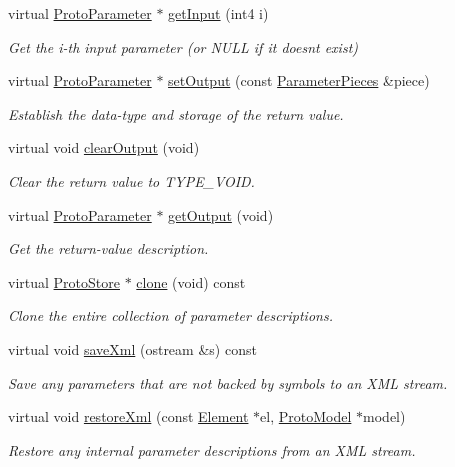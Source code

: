 \begin{DoxyCompactItemize}
virtual \mbox{\hyperlink{class_proto_parameter}{Proto\+Parameter}} $\ast$ \mbox{\hyperlink{class_proto_store_symbol_a55788c21f1b3699731f1956d75ef1d45}{get\+Input}} (int4 i)
\begin{DoxyCompactList}\small\item\em Get the i-\/th input parameter (or N\+U\+LL if it doesn\textquotesingle{}t exist) \end{DoxyCompactList}\item 
virtual \mbox{\hyperlink{class_proto_parameter}{Proto\+Parameter}} $\ast$ \mbox{\hyperlink{class_proto_store_symbol_a06c54299b4b14b6b41a26cdcee6d5484}{set\+Output}} (const \mbox{\hyperlink{struct_parameter_pieces}{Parameter\+Pieces}} \&piece)
\begin{DoxyCompactList}\small\item\em Establish the data-\/type and storage of the return value. \end{DoxyCompactList}\item 
virtual void \mbox{\hyperlink{class_proto_store_symbol_aadbd3a9fba172e28405eeb0001292bff}{clear\+Output}} (void)
\begin{DoxyCompactList}\small\item\em Clear the return value to T\+Y\+P\+E\+\_\+\+V\+O\+ID. \end{DoxyCompactList}\item 
virtual \mbox{\hyperlink{class_proto_parameter}{Proto\+Parameter}} $\ast$ \mbox{\hyperlink{class_proto_store_symbol_a19fe1743657cce5d27aec73bf9056566}{get\+Output}} (void)
\begin{DoxyCompactList}\small\item\em Get the return-\/value description. \end{DoxyCompactList}\item 
virtual \mbox{\hyperlink{class_proto_store}{Proto\+Store}} $\ast$ \mbox{\hyperlink{class_proto_store_symbol_aa6631290325889edb7ef7699fdd8a90f}{clone}} (void) const
\begin{DoxyCompactList}\small\item\em Clone the entire collection of parameter descriptions. \end{DoxyCompactList}\item 
virtual void \mbox{\hyperlink{class_proto_store_symbol_a0989f9e72831242facf0f4d1b563ec38}{save\+Xml}} (ostream \&s) const
\begin{DoxyCompactList}\small\item\em Save any parameters that are not backed by symbols to an X\+ML stream. \end{DoxyCompactList}\item 
virtual void \mbox{\hyperlink{class_proto_store_symbol_a6438185b37fc367226073f194a38d110}{restore\+Xml}} (const \mbox{\hyperlink{class_element}{Element}} $\ast$el, \mbox{\hyperlink{class_proto_model}{Proto\+Model}} $\ast$model)
\begin{DoxyCompactList}\small\item\em Restore any internal parameter descriptions from an X\+ML stream. \end{DoxyCompactList}\end{DoxyCompactItemize}


